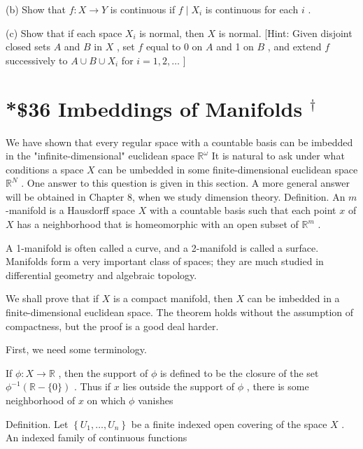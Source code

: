 (b) Show that \(f : X \rightarrow  Y\) is continuous if \(f \mid  {X}_{i}\) is continuous for each \(i\) .

(c) Show that if each space \({X}_{i}\) is normal, then \(X\) is normal. [Hint: Given disjoint closed sets \(A\) and \(B\) in \(X\) , set \(f\) equal to 0 on \(A\) and 1 on \(B\) , and extend \(f\) successively to \(A \cup  B \cup  {X}_{i}\) for \(i = 1,2,\ldots\) ]

\section*{*\$36 Imbeddings of Manifolds \({}^{ \dagger  }\)}

We have shown that every regular space with a countable basis can be imbedded in the "infinite-dimensional" euclidean space \({\mathbb{R}}^{\omega }\) It is natural to ask under what conditions a space \(X\) can be umbedded in some finite-dimensional euclidean space \({\mathbb{R}}^{N}\) . One answer to this question is given in this section. A more general answer will be obtained in Chapter 8, when we study dimension theory. Definition. An \(m\) -manifold is a Hausdorff space \(X\) with a countable basis such that each point \(x\) of \(X\) has a neighborhood that is homeomorphic with an open subset of \({\mathbb{R}}^{m}\) .


A 1-manifold is often called a curve, and a 2-manifold is called a surface. Manifolds form a very important class of spaces; they are much studied in differential geometry\cite{GuilleminPollack1974} and algebraic topology.

We shall prove that if \(X\) is a compact manifold, then \(X\) can be imbedded in a finite-dimensional euclidean space. The theorem holds without the assumption of compactness, but the proof is a good deal harder.

First, we need some terminology.

If \(\phi  : X \rightarrow  \mathbb{R}\) , then the support of \(\phi\) is defined to be the closure of the set \({\phi }^{-1}\left( {\mathbb{R}-\{ 0\} }\right)\) . Thus if \(x\) lies outside the support of \(\phi\) , there is some neighborhood of \(x\) on which \(\phi\) vanishes

Definition. Let \(\left\{  {{U}_{1},\ldots ,{U}_{n}}\right\}\) be a finite indexed open covering of the space \(X\) . An indexed family of continuous functions

